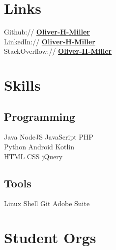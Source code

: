 \documentclass[letterpaper]{deedy-resume} %
\begin{document}
\begin{minipage}[t]{0.33\textwidth}
\sectionspace %


\section{Links} 

Github:// \href{https://github.com/Oliver-H-Miller}{\bf Oliver-H-Miller} \\
LinkedIn:// \href{https://www.linkedin.com/in/Oliver-H-Miller}{\bf Oliver-H-Miller} \\
StackOverflow:// \href{https://stackoverflow.com/users/3152313}{\bf Oliver-H-Miller} \\

\sectionspace %


\section{Skills}

\subsection{Programming}
Java \textbullet{} NodeJS \textbullet{} JavaScript \textbullet{} PHP \\
Python \textbullet{} Android \textbullet{} Kotlin \\
HTML \textbullet{} CSS \textbullet{} jQuery \\

\sectionspace %

\subsection{Tools}
Linux \textbullet{} Shell \textbullet{} Git \textbullet{} Adobe Suite \\

\sectionspace %


\section{Student Orgs}


\end{minipage}
\end{document}
